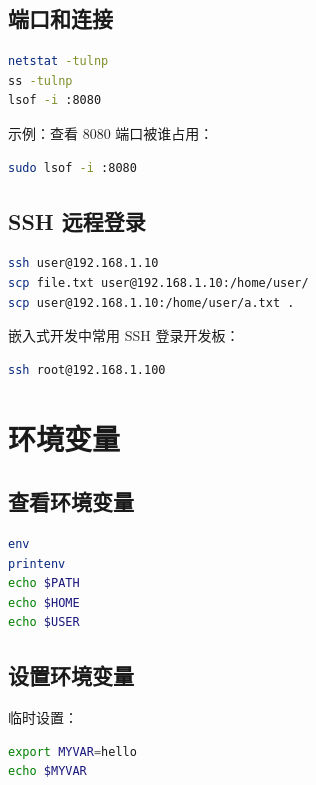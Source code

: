 \documentclass[UTF8,a4paper,12pt]{ctexart}
\begin{document}
\subsection{端口和连接}

\begin{lstlisting}[language=bash]
netstat -tulnp
ss -tulnp
lsof -i :8080
\end{lstlisting}

示例：查看 8080 端口被谁占用：

\begin{lstlisting}[language=bash]
sudo lsof -i :8080
\end{lstlisting}

\subsection{SSH 远程登录}

\begin{lstlisting}[language=bash]
ssh user@192.168.1.10
scp file.txt user@192.168.1.10:/home/user/
scp user@192.168.1.10:/home/user/a.txt .
\end{lstlisting}

嵌入式开发中常用 SSH 登录开发板：

\begin{lstlisting}[language=bash]
ssh root@192.168.1.100
\end{lstlisting}

\section{环境变量}

\subsection{查看环境变量}

\begin{lstlisting}[language=bash]
env
printenv
echo $PATH
echo $HOME
echo $USER
\end{lstlisting}

\subsection{设置环境变量}

临时设置：

\begin{lstlisting}[language=bash]
export MYVAR=hello
echo $MYVAR
\end{lstlisting}
\end{document}
